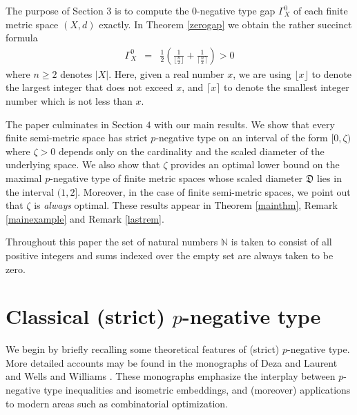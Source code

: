 \documentclass[10pt]{amsart}
\theoremstyle{definition}
\theoremstyle{remark}
\begin{document}
The purpose of Section $3$ is to compute the $0$-negative type gap $\Gamma_{X}^{0}$ of each
finite metric space $(X,d)$ exactly. In Theorem \ref{zerogap} we obtain the rather succinct formula
\begin{eqnarray*}
\Gamma_{X}^{0} & = &
\frac{1}{2} \left( \frac{1}{\lfloor \frac{n}{2} \rfloor} + \frac{1}{\lceil \frac{n}{2} \rceil} \right) > 0
\end{eqnarray*}
where $n \geq 2$ denotes $|X|$. Here, given a real number $x$, we are using $\lfloor x \rfloor$ to
denote the largest integer that does not exceed $x$, and $\lceil x \rceil$ to denote the smallest
integer number which is not less than $x$.

The paper culminates in Section $4$ with our main results. We show that every finite semi-metric space
has strict $p$-negative type on an interval of the form $[0,\zeta)$ where $\zeta > 0$
depends only on the cardinality and the scaled diameter of the underlying space.
We also show that $\zeta$ provides an optimal lower bound
on the maximal $p$-negative type of finite metric spaces whose scaled diameter $\mathfrak{D}$ lies in
the interval $(1,2]$. Moreover, in the case of finite semi-metric spaces, we point out that $\zeta$
is \textit{always} optimal. These results appear in Theorem \ref{mainthm}, Remark \ref{mainexample}
and Remark \ref{lastrem}.

Throughout this paper the set of natural numbers $\mathbb{N}$ is taken to consist of all positive integers
and sums indexed over the empty set are always taken to be zero.

\section{Classical (strict) $p$-negative type}
We begin by briefly recalling some theoretical features of (strict) $p$-negative type.
More detailed accounts may be found in the monographs of Deza and Laurent \cite{DL} and
Wells and Williams \cite{WW}. These monographs emphasize the interplay between $p$-negative
type inequalities and isometric embeddings, and (moreover) applications to modern areas such as
combinatorial optimization.
\end{document}
